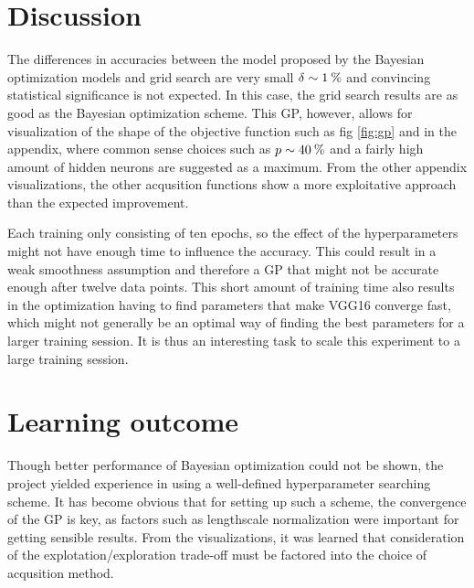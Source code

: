 \documentclass[12pt,fleqn]{article}
\begin{document}
\begin{multicols}{2}

\section{Discussion}

The differences in accuracies between the model proposed by the Bayesian optimization models and grid search are very small \(\delta \sim 1\:\text{\%{}} \) and convincing statistical significance is not expected. In this case, the grid search results are as good as the Bayesian optimization scheme. This GP, however, allows for visualization of the shape of the objective function such as fig \ref{fig:gp} and in the appendix, where common sense choices such as \(p\sim 40\:\text{\%{}} \) and a fairly high amount of hidden neurons are suggested as a maximum. From the other appendix visualizations, the other acqusition functions show a more exploitative approach than the expected improvement.

Each training only consisting of ten epochs, so the effect of the hyperparameters might not have enough time to influence the accuracy. This could result in a weak smoothness assumption and therefore a GP that might not be accurate enough after twelve data points. This short amount of training time also results in the optimization having to find parameters that make VGG16 converge fast, which might not generally be an optimal way of finding the best parameters for a larger training session. It is thus an interesting task to scale this experiment to a large training session. 


\section{Learning outcome}

Though better performance of Bayesian optimization could not be shown, the project yielded experience in using a well-defined hyperparameter searching scheme. It has become obvious that for setting up such a scheme, the convergence of the GP is key, as factors such as lengthscale normalization were important for getting sensible results. From the visualizations, it was learned that consideration of the explotation/exploration trade-off must be factored into the choice of acqusition method.


\end{multicols}
\end{document}
